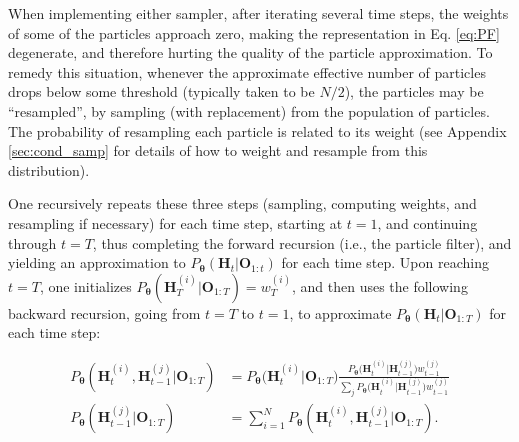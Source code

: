 \documentclass[10pt]{article}
\providecommand{\ve}[1]{\boldsymbol{#1}}
\providecommand{\ve}[1]{\boldsymbol{#1}}
\newcommand{\thetn}{\ve{\theta}}
\newcommand{\p}{P_{\thetn}}
\begin{document}
When implementing either sampler, after iterating several time steps, the weights of some of the particles approach zero, making the representation in Eq. \ref{eq:PF} degenerate, and therefore hurting the quality of the particle approximation. To remedy this situation, whenever the approximate effective number of particles drops below some threshold (typically taken to be $N/2$), the particles may be ``resampled'', by sampling (with replacement) from the population of particles.  The probability of resampling each particle is related to its weight \cite{DoucMoulines05} 
(see Appendix \ref{sec:cond_samp} for details of how to weight and resample from this distribution).

One recursively repeats these three steps (sampling, computing weights, and resampling if necessary) for each time step, starting at $t=1$, and continuing through $t=T$, thus completing the forward recursion (i.e., the particle filter), and yielding an approximation to $\p(\ve{H}_t |  \ve{O}_{1:t})$ for each time step. Upon reaching $t=T$, one initializes $\p(\ve{H}_T^{(i)}|\ve{O}_{1:T})=w_T^{(i)}$, and then uses the following backward recursion, going from $t=T$ to $t=1$, to approximate $\p(\ve{H}_t | \ve{O}_{1:T})$ for each time step:

\begin{subequations} \label{eq:part_back1}
\begin{align} \label{eq:part_joint1}
\p(\ve{H}_t^{(i)}, \ve{H}_{t-1}^{(j)} | \ve{O}_{1:T}) %
&=\p \big(\ve{H}^{(i)}_t | \ve{O}_{1:T}\big) \frac{
\p \big(\ve{H}^{(i)}_t | \ve{H}^{(j)}_{t-1} \big)
w_{t-1}^{(j)}}{\sum_j \p \big(\ve{H}^{(i)}_t | \ve{H}^{(j)}_{t-1} \big) w_{t-1}^{(j)}}
\\ \label{eq:part_marg1}  \p(\ve{H}_{t-1}^{(j)} | \ve{O}_{1:T})
&= \sum_{i=1}^N \p(\ve{H}_t^{(i)}, \ve{H}_{t-1}^{(j)} | \ve{O}_{1:T}).
\end{align}
\end{subequations}
\end{document}
